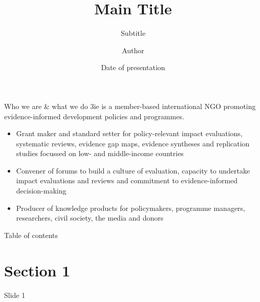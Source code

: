 \documentclass{beamer}
\title{Main Title}
\subtitle{Subtitle}
\author{Author}
\institute{Your title, 3ie}
\date{Date of presentation}
\begin{document}
    \begin{frame}
        \maketitle
    \end{frame}

    \begin{frame}{Who we are \& what we do}
    3ie is a member-based international NGO promoting evidence-informed development policies and programmes. 
    \begin{itemize}   
        \item Grant maker and standard setter for policy-relevant impact evaluations, systematic reviews, evidence gap maps, evidence syntheses and replication studies focussed on low- and middle-income countries
        \item Convener of forums to build a culture of evaluation, capacity to undertake impact evaluations and reviews and commitment to evidence-informed decision-making
        \item Producer of knowledge products for policymakers, programme managers, researchers, civil society, 
the media and donors
    \end{itemize}
    \end{frame}
    
    \begin{frame}{Table of contents}
      \tableofcontents
    \end{frame}
    
    \section{Section 1}
    \begin{frame}[plain]{}
        \sectionpage
    \end{frame}
    
    \begin{frame}{Slide 1}
        \lipsum[1]
    \end{frame}
    
\end{document}
